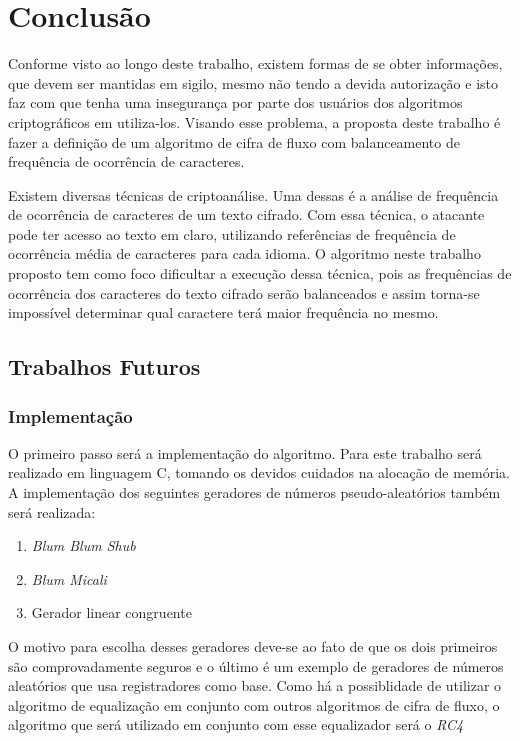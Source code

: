 \chapter{Conclusão}
\label{conclusion}


Conforme visto ao longo deste trabalho, existem formas de se obter informações, que devem ser mantidas em sigilo, mesmo não tendo a devida autorização e isto faz com que tenha uma insegurança por parte dos usuários dos algoritmos criptográficos em utiliza-los. Visando esse problema, a proposta deste trabalho é fazer a definição de um algoritmo de cifra de fluxo com balanceamento de frequência de ocorrência de caracteres.

Existem diversas técnicas de criptoanálise. Uma dessas é a análise de frequência de ocorrência de caracteres de um texto cifrado. Com essa técnica, o atacante pode ter acesso ao texto em claro, utilizando referências de frequência de ocorrência média de caracteres para cada idioma. O algoritmo neste trabalho proposto tem como foco dificultar a execução dessa técnica, pois as frequências de ocorrência dos caracteres do texto cifrado serão balanceados e assim torna-se impossível determinar qual caractere terá maior frequência no mesmo.

\section{Trabalhos Futuros}
\label{future-work}

	\subsection{Implementação}
	\label{implementation}
	
	O primeiro passo será a implementação do algoritmo. Para este trabalho será realizado em linguagem C, tomando os devidos cuidados na alocação de memória. 
	A implementação dos seguintes geradores de números pseudo-aleatórios também será realizada:
		\begin{enumerate}
			\item \textit{Blum Blum Shub}
			\item \textit{Blum Micali}
			\item Gerador linear congruente 
		\end{enumerate}		 
	O motivo para escolha desses geradores deve-se ao fato de que os dois primeiros são comprovadamente seguros e o último é um exemplo de geradores de números aleatórios que usa registradores como base. 
	Como há a possiblidade de utilizar o algoritmo de equalização em conjunto com outros algoritmos de cifra de fluxo, o algoritmo que será utilizado em conjunto com esse equalizador será o \textit{RC4}
	
